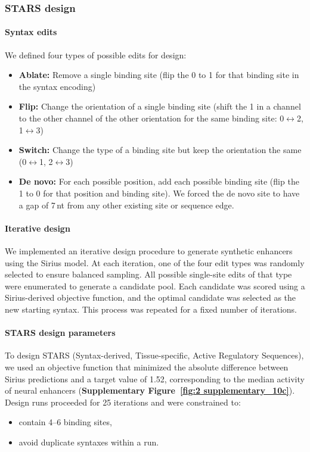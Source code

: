 \subsubsection{STARS design}

\paragraph{Syntax edits}
We defined four types of possible edits for design:
\begin{itemize}
  \item \textbf{Ablate:} Remove a single binding site (flip the 0 to 1 for that binding site in the syntax encoding)
  \item \textbf{Flip:} Change the orientation of a single binding site (shift the 1 in a channel to the other channel of the other orientation for the same binding site: 0\(\leftrightarrow\)2, 1\(\leftrightarrow\)3)
  \item \textbf{Switch:} Change the type of a binding site but keep the orientation the same (0\(\leftrightarrow\)1, 2\(\leftrightarrow\)3)
  \item \textbf{De novo:} For each possible position, add each possible binding site (flip the 1 to 0 for that position and binding site). We forced the de novo site to have a gap of 7\,nt from any other existing site or sequence edge.
\end{itemize}

\paragraph{Iterative design}
We implemented an iterative design procedure to generate synthetic enhancers using the Sirius model. At each iteration, one of the four edit types was randomly selected to ensure balanced sampling. All possible single-site edits of that type were enumerated to generate a candidate pool. Each candidate was scored using a Sirius-derived objective function, and the optimal candidate was selected as the new starting syntax. This process was repeated for a fixed number of iterations.

\paragraph{STARS design parameters}
To design STARS (Syntax-derived, Tissue-specific, Active Regulatory Sequences), we used an objective function that minimized the absolute difference between Sirius predictions and a target value of 1.52, corresponding to the median activity of neural enhancers (\textbf{Supplementary Figure~\ref{fig:2 supplementary_10c}}). Design runs proceeded for 25 iterations and were constrained to:
\begin{itemize}
  \item contain 4--6 binding sites,
  \item avoid duplicate syntaxes within a run.
\end{itemize}

